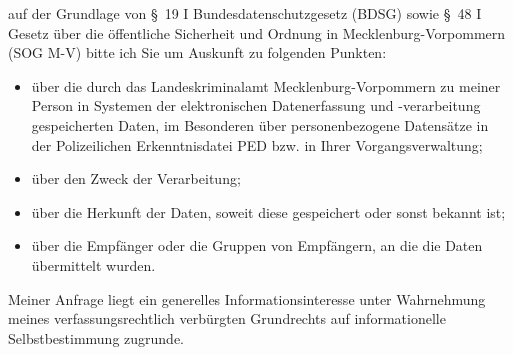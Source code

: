 auf der Grundlage von §~19 I Bundesdatenschutzgesetz (BDSG) sowie
§~48 I Gesetz über die öffentliche Sicherheit und Ordnung in Mecklenburg-Vorpommern
(SOG M-V) bitte ich Sie um Auskunft zu folgenden Punkten:

\begin{itemize}
  \item über die durch das Landeskriminalamt Mecklenburg-Vorpommern zu meiner Person
  in Systemen der elektronischen Datenerfassung und -verarbeitung gespeicherten
  Daten, im Besonderen über personenbezogene Datensätze in der Polizeilichen Erkenntnisdatei
  PED bzw. in Ihrer Vorgangsverwaltung;

  \item über den Zweck der Verarbeitung;

  \item über die Herkunft der Daten, soweit diese gespeichert oder sonst bekannt ist;

  \item über die Empfänger oder die Gruppen von Empfängern, an die die Daten übermittelt wurden.
\end{itemize}

Meiner Anfrage liegt ein generelles Informationsinteresse unter Wahrnehmung
meines verfassungsrechtlich verbürgten Grundrechts auf informationelle
Selbstbestimmung zugrunde.
